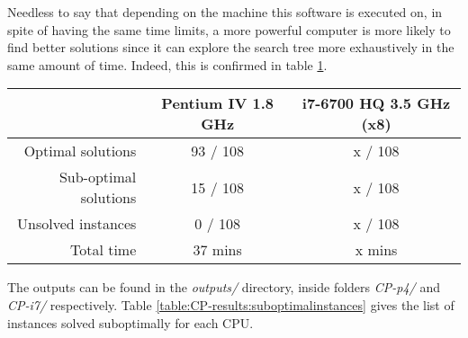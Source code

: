 Needless to say that depending on the machine this software is executed on,
in spite of having the same time limits, a more powerful computer is more likely
to find better solutions since it can explore the search tree more exhaustively
in the same amount of time. Indeed, this is confirmed in table \ref{table:CP-results}.

\begin{table}[H]
\centering
	\begin{tabular}{rcc}
								& Pentium IV 1.8 GHz	& i7-6700 HQ 3.5 GHz (x8) \\
		\midrule
		Optimal solutions		& 93 / 108				& x / 108 \\
		Sub-optimal solutions	& 15 / 108				& x / 108 \\
		Unsolved instances		&  0 / 108				& x / 108 \\
		Total time				& 37 mins				& x mins \\
	\end{tabular}
	\label{table:CP-results}
\end{table}

The outputs can be found in the \textit{outputs/} directory, inside folders
\textit{CP-p4/} and \textit{CP-i7/} respectively. Table \ref{table:CP-results:suboptimalinstances}
gives the list of instances solved suboptimally for each CPU.

